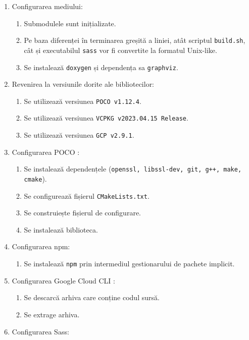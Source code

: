 \begin{enumerate}
  \item Configurarea mediului:
    \begin{enumerate}
      \item Submodulele sunt inițializate.
      \item Pe baza diferenței în terminarea greșită a liniei, atât scriptul \texttt{build.sh}, cât și executabilul \texttt{sass} vor fi convertite la formatul Unix-like.
      \item Se instalează \texttt{doxygen} și dependența sa \texttt{graphviz}.
    \end{enumerate}
  \item Revenirea la versiunile dorite ale bibliotecilor:
    \begin{enumerate}
      \item Se utilizează versiunea \texttt{POCO v1.12.4}.
      \item Se utilizează versiunea \texttt{VCPKG v2023.04.15 Release}.
      \item Se utilizează versiunea \texttt{GCP v2.9.1}.
    \end{enumerate}
  \item Configurarea POCO \cite{poco}:
    \begin{enumerate}
      \item Se instalează dependențele (\texttt{openssl, libssl-dev, git, g++, make, cmake}).
      \item Se configurează fișierul \texttt{CMakeLists.txt}.
      \item Se construiește fișierul de configurare.
      \item Se instalează biblioteca.
    \end{enumerate}
  \item Configurarea npm:
    \begin{enumerate}
      \item Se instalează \texttt{npm} prin intermediul gestionarului de pachete implicit.
    \end{enumerate}
  \item Configurarea Google Cloud CLI \cite{gcloud-cli}:
    \begin{enumerate}
      \item Se descarcă arhiva care conține codul sursă.
      \item Se extrage arhiva.
    \end{enumerate}
  \item Configurarea Sass:
    \begin{enumerate}

\end{enumerate}
\end{enumerate}
